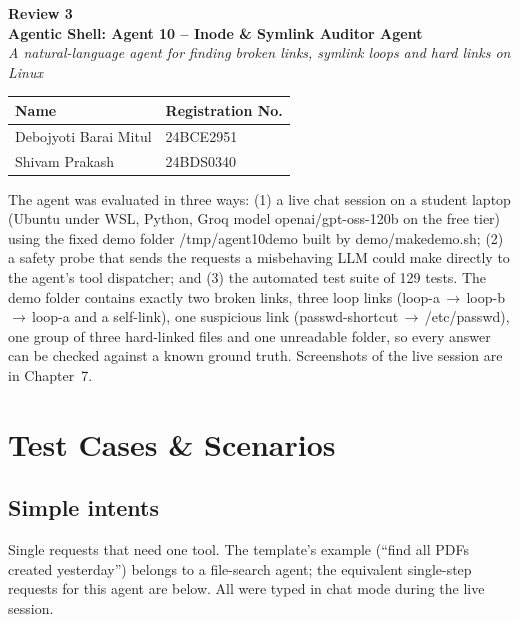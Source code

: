 \documentclass[12pt,a4paper]{article}
\newcommand{\chapterheading}[1]{\par\vspace{0.8em}{\noindent\Large\bfseries #1\par}\vspace{0.5em}}
\DeclareRobustCommand{\code}[1]{{\ttfamily\renewcommand{\_}{\textunderscore\allowbreak}#1}}
\begin{document}
\begin{center}
  {\Large\bfseries Review 3}\\[4pt]
  {\large\bfseries Agentic Shell: Agent 10 -- Inode \& Symlink Auditor Agent}\\[2pt]
  {\itshape A natural-language agent for finding broken links, symlink loops and hard links on Linux}\\[10pt]
  \begin{tabular}{|l|l|}
    \hline
    \textbf{Name} & \textbf{Registration No.} \\ \hline
    Debojyoti Barai Mitul & 24BCE2951 \\ \hline
    Shivam Prakash        & 24BDS0340 \\ \hline
  \end{tabular}
\end{center}
\vspace{6pt}

\chapterheading{Chapter 5: Testing, Evaluation, and Results}
\setcounter{section}{0}
\renewcommand{\thesection}{5.\arabic{section}}

The agent was evaluated in three ways: (1) a live chat session on a student laptop
(Ubuntu under WSL, Python, Groq model \code{openai/\allowbreak gpt-oss-120b} on the free tier) using the
fixed demo folder \code{/tmp/agent10\_demo} built by \code{demo/make\_demo.sh}; (2) a safety probe
that sends the requests a misbehaving LLM could make directly to the agent's tool dispatcher;
and (3) the automated test suite of 129 tests. The demo folder contains exactly two broken links,
three loop links (\code{loop-a}\,$\rightarrow$\,\code{loop-b}\,$\rightarrow$\,\code{loop-a} and a
self-link), one suspicious link (\code{passwd-shortcut}\,$\rightarrow$\,\code{/etc/passwd}), one group
of three hard-linked files and one unreadable folder, so every answer can be checked against a
known ground truth. Screenshots of the live session are in Chapter~7.

\section{Test Cases \& Scenarios}

\subsection{Simple intents}
Single requests that need one tool. The template's example (``find all PDFs created yesterday'')
belongs to a file-search agent; the equivalent single-step requests for this agent are below.
All were typed in chat mode during the live session.
\end{document}
